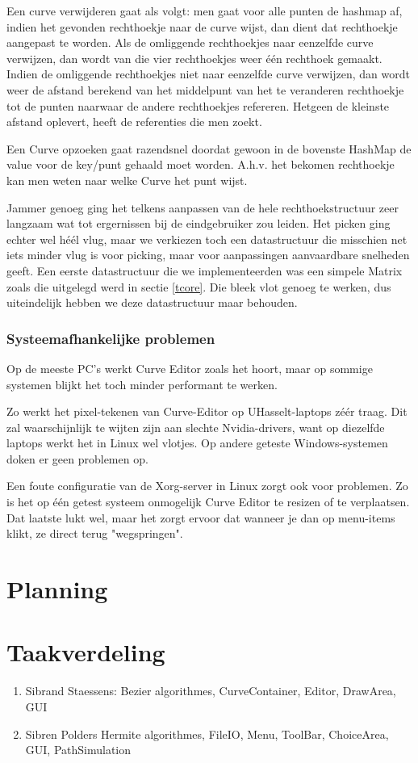 \documentclass[a4paper,11pt,oneside, titlepage]{article}
\begin{document}
Een curve verwijderen gaat als volgt: men gaat voor alle punten de hashmap af, indien het gevonden rechthoekje naar de curve wijst, dan dient dat rechthoekje aangepast te worden. Als de omliggende rechthoekjes naar eenzelfde curve verwijzen, dan wordt van die vier rechthoekjes weer één rechthoek gemaakt. Indien de omliggende rechthoekjes niet naar eenzelfde curve verwijzen, dan wordt weer de afstand berekend van het middelpunt van het te veranderen rechthoekje tot de punten naarwaar de andere rechthoekjes refereren. Hetgeen de kleinste afstand oplevert, heeft de referenties die men zoekt. 

Een Curve opzoeken gaat razendsnel doordat gewoon in de bovenste HashMap de value voor de key/punt gehaald moet worden. 
A.h.v. het bekomen rechthoekje kan men weten naar welke Curve het punt wijst.

Jammer genoeg ging het telkens aanpassen van de hele rechthoekstructuur zeer langzaam wat tot ergernissen bij de eindgebruiker zou leiden. Het picken ging echter wel h\'e\'el vlug, maar we verkiezen toch een datastructuur die misschien net iets minder vlug is voor picking, maar voor aanpassingen aanvaardbare snelheden geeft.
Een eerste datastructuur die we implementeerden was een simpele Matrix zoals die uitgelegd werd in sectie \ref{tcore}. Die bleek vlot genoeg te werken, dus uiteindelijk hebben we deze datastructuur maar behouden.
\subsubsection{Systeemafhankelijke problemen}
Op de meeste PC's werkt Curve Editor zoals het hoort, maar op sommige systemen blijkt het toch minder performant te werken.

Zo werkt het pixel-tekenen van Curve-Editor op UHasselt-laptops z\'e\'er traag. Dit zal waarschijnlijk te wijten zijn aan slechte Nvidia-drivers, want op diezelfde laptops werkt het in Linux wel vlotjes.
Op andere geteste Windows-systemen doken er geen problemen op.

Een foute configuratie van de Xorg-server in Linux zorgt ook voor problemen. Zo is het op \'e\'en getest systeem onmogelijk Curve Editor te resizen of te verplaatsen. Dat laatste lukt wel, maar het zorgt ervoor dat 
wanneer je dan op menu-items klikt, ze direct terug "wegspringen".
\newpage
\section{Planning}
\newpage
\section{Taakverdeling}
\begin{enumerate}
\item Sibrand Staessens:
       Bezier algorithmes, CurveContainer, Editor, DrawArea, GUI
\item Sibren Polders
       Hermite algorithmes, FileIO, Menu, ToolBar, ChoiceArea, GUI, PathSimulation
\end{enumerate}
\newpage
\end{document}
